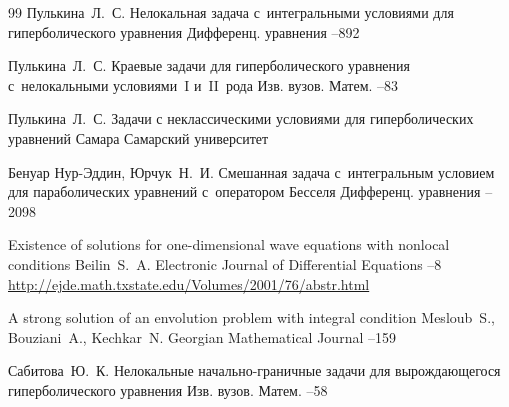 \begin{thebibliography}{99}
\by Пулькина~Л.~С.
\paper Нелокальная задача с~интегральными условиями для гиперболического уравнения
\jour Дифференц. уравнения
--892

\by Пулькина~Л.~С.
\paper Краевые задачи для гиперболического уравнения с~нелокальными условиями~I и~II~рода
\jour Изв. вузов. Матем.
--83

\by Пулькина~Л.~С.
\book Задачи с неклассическими условиями для гиперболических уравнений
\publaddr Самара
\publ Самарский университет

\by  Бенуар Нур-Эддин, Юрчук~Н.~И.
\paper Смешанная задача с~интегральным условием для параболических уравнений с~оператором Бесселя
\jour Дифференц. уравнения
--2098

\paper Existence of solutions for one-dimensional wave equations with nonlocal conditions
\by Beilin~S.~A.
\jour Electronic Journal of Differential Equations
--8
\elink \url{http://ejde.math.txstate.edu/Volumes/2001/76/abstr.html}

\paper A strong solution of an envolution problem with integral condition
\by  Mesloub~S., Bouziani~A.,  Kechkar~N.
\jour Georgian Mathematical Journal
--159


\by Сабитова~Ю.~К.
\paper Нелокальные начально-граничные задачи для вырождающегося гиперболического уравнения
\jour Изв. вузов. Матем.
--58



\end{thebibliography}

